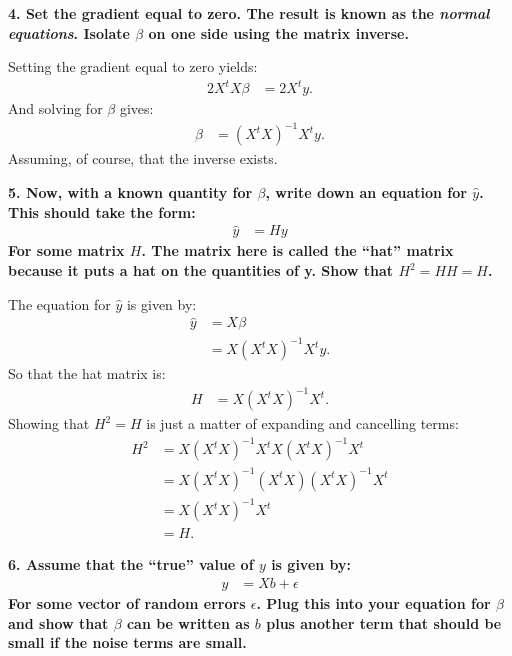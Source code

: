 \documentclass[12pt,hidelinks]{article}
\numberwithin{equation}{section}
\begin{document}
\vspace*{12pt}

\textbf{4. Set the gradient equal to zero. The result is known as the
\textit{normal equations}. Isolate $\beta$ on one side using the matrix inverse.}

\vspace*{12pt}

Setting the gradient equal to zero yields:
\begin{align}
2 X^t X \beta &= 2 X^t y.
\end{align}
And solving for $\beta$ gives:
\begin{align}
\beta &= (X^t X)^{-1} X^t y.
\end{align}
Assuming, of course, that the inverse exists.


\vspace*{12pt}

\textbf{5. Now, with a known quantity for $\beta$, write down an equation for $\widehat{y}$.
This should take the form:}
\begin{align}
\widehat{y} &= H y
\end{align}
\textbf{For some matrix $H$. The matrix here is called the ``hat'' matrix because it
puts a hat on the quantities of y. Show that $H^2 = HH = H$.}

\vspace*{12pt}

The equation for $\widehat{y}$ is given by:
\begin{align}
\widehat{y} &= X\beta\\
&= X (X^t X)^{-1} X^t y.
\end{align}
So that the hat matrix is:
\begin{align}
H &= X (X^t X)^{-1} X^t.
\end{align}
Showing that $H^2 = H$ is just a matter of expanding and cancelling terms:
\begin{align}
H^2 &= X (X^t X)^{-1} X^t X (X^t X)^{-1} X^t \\
&= X (X^t X)^{-1} (X^t X) (X^t X)^{-1} X^t \\
&= X (X^t X)^{-1} X^t \\
&= H.
\end{align}

\vspace*{12pt}

\textbf{6. Assume that the ``true'' value of $y$ is given by:}
\begin{align}
y &= X b + \epsilon
\end{align}
\textbf{For some vector of random errors $\epsilon$. Plug this into your equation for
$\beta$ and show that $\beta$ can be written as $b$ plus another term that should
be small if the noise terms are small.}
\end{document}
